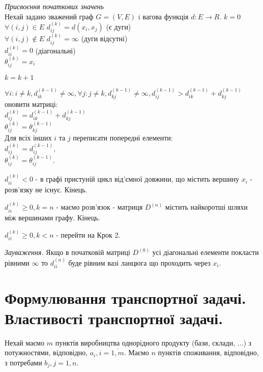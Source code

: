 \documentclass[12pt,a4paper]{report}
\newenvironment{slim_enumerate}{
\begin{enumerate}
  \setlength{\itemsep}{1pt}
  \setlength{\parskip}{0pt}
  \setlength{\parsep}{0pt}}
{\end{enumerate}}
\begin{document}
\begin{slim_enumerate}
  \item \emph{Присвоєння початкових значень}\\
Нехай задано зважений граф $G=(V,E)$ i вагова функція $d:E \rightarrow R$.
$k=0$\\
$\forall (i,j) \in E$ $d_{ij}^{(k)}=d(x_i,x_j)$ (є дуги)\\
$\forall (i,j) \notin E$ $d_{ij}^{(k)}=\infty$ (дуги відсутні)\\
$d_{ii}^{(k)}=0$ (діагональні)\\
$\theta_{ij}^{(k)}=x_i$
  \item $k=k+1$
  \item $\forall i: i \neq k, d_{ik}^{(k-1)} \neq \infty, \forall j: j \neq k, d_{kj}^{(k-1)} \neq \infty, d_{ij}^{(k-1)}>d_{ik}^{(k-1)}+d_{kj}^{(k-1)}$ оновити матриці:\\
$d_{ij}^{(k)}=d_{ik}^{(k-1)}+d_{kj}^{(k-1)}$\\
$\theta_{ij}^{(k)}=\theta_{kj}^{(k-1)}$\\
Для всіх інших $i$ та $j$ переписати попередні елементи:\\
$d_{ij}^{(k)}=d_{ij}^{(k-1)}$,\\
$\theta_{ij}^{(k)}=\theta_{ij}^{(k-1)}$.
  \item 
    \begin{slim_enumerate}
      \item $d_{ii}^{(k)} < 0$ - в графі пристуній цикл від’ємної довжини, що містить вершину $x_i$ - розв’язку не існує. Кінець.
      \item $d_{ii}^{(k)} \geq 0, k=n$ - маємо розв’язок - матриця $D^{(n)}$ містить найкоротші шляхи між вершинами графу. Кінець.
      \item $d_{ii}^{(k)} \geq 0, k<n$ - перейти на Крок 2.
    \end{slim_enumerate}
\end{slim_enumerate}

\emph{Зауваження.} Якщо в початковій матриці $D^{(0)}$ усі діагональні елементи покласти рівними $\infty$ то $d_{ii}^{(n)}$ буде рівним вазі ланцюга що проходить через $x_i$.

\clearpage

\chapter{Формулювання транспортної задачі. Властивості транспортної задачі.}

Нехай маємо $m$ пунктів виробництва однорідного продукту (бази, склади, ...) з потужностями, відповідно, $a_i, i = \overline{1, m}$. Маємо $n$ пунктів споживання, відповідно, з потребами $b_j, j =\overline{1, n}$.
\end{document}
